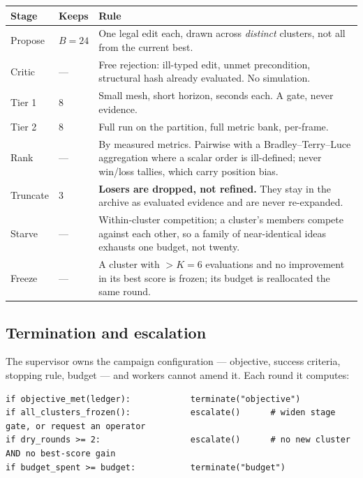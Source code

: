 \documentclass[11pt]{article}
\begin{document}
\begin{center}\small
\begin{tabular}{@{}llp{7.6cm}@{}}
\toprule
\textbf{Stage} & \textbf{Keeps} & \textbf{Rule} \\
\midrule
Propose  & $B=24$ & One legal edit each, drawn across \emph{distinct} clusters, not all from the
current best. \\
Critic   & --- & Free rejection: ill-typed edit, unmet precondition, structural hash already
evaluated. No simulation. \\
Tier 1   & $8$ & Small mesh, short horizon, seconds each. A gate, never evidence. \\
Tier 2   & $8$ & Full run on the partition, full metric bank, per-frame. \\
Rank     & --- & By measured metrics. Pairwise with a Bradley--Terry--Luce aggregation where a
scalar order is ill-defined; never win/loss tallies, which carry position bias. \\
Truncate & $3$ & \textbf{Losers are dropped, not refined.} They stay in the archive as evaluated
evidence and are never re-expanded. \\
Starve   & --- & Within-cluster competition; a cluster's members compete against each other, so a
family of near-identical ideas exhausts one budget, not twenty. \\
Freeze   & --- & A cluster with $>K=6$ evaluations and no improvement in its best score is frozen;
its budget is reallocated the same round. \\
\bottomrule
\end{tabular}
\end{center}

\subsection{Termination and escalation}

The supervisor owns the campaign configuration --- objective, success criteria, stopping rule,
budget --- and workers cannot amend it. Each round it computes:

\begin{lstlisting}
if objective_met(ledger):            terminate("objective")
if all_clusters_frozen():            escalate()      # widen stage gate, or request an operator
if dry_rounds >= 2:                  escalate()      # no new cluster AND no best-score gain
if budget_spent >= budget:           terminate("budget")
\end{lstlisting}
\end{document}
